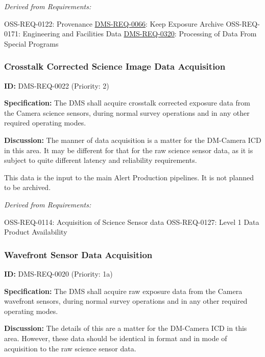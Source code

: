 \documentclass[SE,toc,lsstdraft]{lsstdoc}
\begin{document}
\emph{Derived from Requirements:}

OSS-REQ-0122:
Provenance \newline
\hyperref[DMS-REQ-0066]{DMS-REQ-0066}:
Keep Exposure Archive \newline
OSS-REQ-0171:
Engineering and Facilities Data \newline
\hyperref[DMS-REQ-0320]{DMS-REQ-0320}:
Processing of Data From Special Programs \newline

\subsubsection{Crosstalk Corrected Science Image Data Acquisition}

\label{DMS-REQ-0022}
\textbf{ID:} DMS-REQ-0022 (Priority: 2)

\textbf{Specification:} The DMS shall acquire crosstalk corrected exposure data from the Camera science sensors, during normal survey operations and in any other required operating modes.

\textbf{Discussion:} The manner of data acquisition is a matter for the DM-Camera ICD in this area.  It may be different for that for the raw science sensor data, as it is subject to quite different latency and reliability requirements.

This data is the input to the main Alert Production pipelines.  It is not planned to be archived.

\emph{Derived from Requirements:}

OSS-REQ-0114:
Acquisition of Science Sensor data \newline
OSS-REQ-0127:
Level 1 Data Product Availability \newline

\subsubsection{Wavefront Sensor Data Acquisition}

\label{DMS-REQ-0020}
\textbf{ID:} DMS-REQ-0020 (Priority: 1a)

\textbf{Specification:} The DMS shall acquire raw exposure data from the Camera wavefront sensors, during normal survey operations and in any other required operating modes.

\textbf{Discussion:} The details of this are a matter for the DM-Camera ICD in this area. However, these data should be identical in format and in mode of acquisition to the raw science sensor data.
\end{document}
